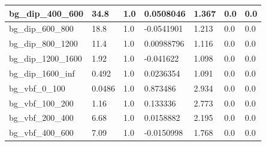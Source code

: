 \documentclass[a4paper, 10pt]{article}
\begin{document}
\begin{table}[H]
\begin{center}
\begin{tabular}{|m{23.0mm}|m{23.0mm}|m{18.0mm}|m{19.0mm}|m{19.0mm}|m{19.0mm}|m{19.0mm}|}
      \hline
      {\cellcolor{white}         bg\_dip\_400\_600}& {\cellcolor{white}         34.8}& {\cellcolor{white}         1.0}& {\cellcolor{white}         0.0508046}& {\cellcolor{white}         1.367}& {\cellcolor{green}         0.0}& {\cellcolor{green}         0.0}\\
      \hline
      {\cellcolor{white}         bg\_dip\_600\_800}& {\cellcolor{white}         18.8}& {\cellcolor{white}         1.0}& {\cellcolor{white}         -0.0541901}& {\cellcolor{white}         1.213}& {\cellcolor{green}         0.0}& {\cellcolor{green}         0.0}\\
      \hline
      {\cellcolor{white}         bg\_dip\_800\_1200}& {\cellcolor{white}         11.4}& {\cellcolor{white}         1.0}& {\cellcolor{white}         0.00988796}& {\cellcolor{white}         1.116}& {\cellcolor{green}         0.0}& {\cellcolor{green}         0.0}\\
      \hline
      {\cellcolor{white}         bg\_dip\_1200\_1600}& {\cellcolor{white}         1.92}& {\cellcolor{white}         1.0}& {\cellcolor{white}         -0.041622}& {\cellcolor{white}         1.098}& {\cellcolor{green}         0.0}& {\cellcolor{green}         0.0}\\
      \hline
      {\cellcolor{white}         bg\_dip\_1600\_inf}& {\cellcolor{white}         0.492}& {\cellcolor{white}         1.0}& {\cellcolor{white}         0.0236354}& {\cellcolor{white}         1.091}& {\cellcolor{green}         0.0}& {\cellcolor{green}         0.0}\\
      \hline
      {\cellcolor{white}         bg\_vbf\_0\_100}& {\cellcolor{white}         0.0486}& {\cellcolor{white}         1.0}& {\cellcolor{white}         0.873486}& {\cellcolor{white}         2.934}& {\cellcolor{green}         0.0}& {\cellcolor{green}         0.0}\\
      \hline
      {\cellcolor{white}         bg\_vbf\_100\_200}& {\cellcolor{white}         1.16}& {\cellcolor{white}         1.0}& {\cellcolor{white}         0.133336}& {\cellcolor{white}         2.773}& {\cellcolor{green}         0.0}& {\cellcolor{green}         0.0}\\
      \hline
      {\cellcolor{white}         bg\_vbf\_200\_400}& {\cellcolor{white}         6.68}& {\cellcolor{white}         1.0}& {\cellcolor{white}         0.0158882}& {\cellcolor{white}         2.195}& {\cellcolor{green}         0.0}& {\cellcolor{green}         0.0}\\
      \hline
      {\cellcolor{white}         bg\_vbf\_400\_600}& {\cellcolor{white}         7.09}& {\cellcolor{white}         1.0}& {\cellcolor{white}         -0.0150998}& {\cellcolor{white}         1.768}& {\cellcolor{green}         0.0}& {\cellcolor{green}         0.0}\\

\end{tabular}
\end{center}
\end{table}
\end{document}
